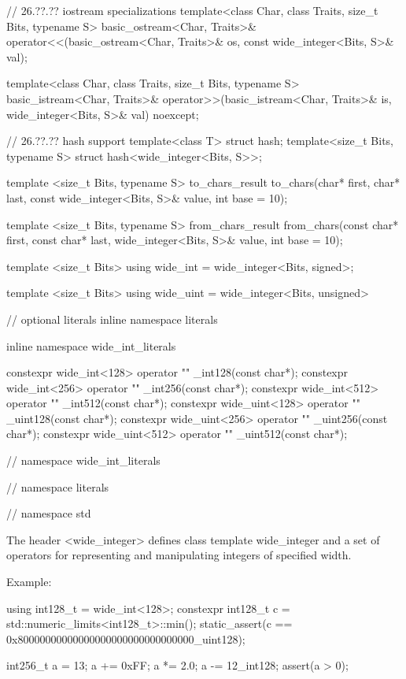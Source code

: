 \begin{codeblock}
{  // 26.??.?? iostream specializations
  template<class Char, class Traits, size_t Bits, typename S>
    basic_ostream<Char, Traits>& operator<<(basic_ostream<Char, Traits>& os,
                                            const wide_integer<Bits, S>& val);
  
  template<class Char, class Traits, size_t Bits, typename S>
    basic_istream<Char, Traits>& operator>>(basic_istream<Char, Traits>& is,
                                            wide_integer<Bits, S>& val) noexcept;
  
  // 26.??.?? hash support
  template<class T> struct hash;
  template<size_t Bits, typename S> struct hash<wide_integer<Bits, S>>;
  
  
  template <size_t Bits, typename S>
    to_chars_result to_chars(char* first, char* last, const wide_integer<Bits, S>& value,
                             int base = 10);
  
  template <size_t Bits, typename S>
    from_chars_result from_chars(const char* first, const char* last, wide_integer<Bits, S>& value,
                                 int base = 10);
  
  template <size_t Bits>
  using wide_int = wide_integer<Bits, signed>;
  
  template <size_t Bits>
  using wide_uint = wide_integer<Bits, unsigned>
  
  // optional literals
  inline namespace literals {
  inline namespace wide_int_literals {
        
  constexpr wide_int<128> operator "" _int128(const char*);
  constexpr wide_int<256> operator "" _int256(const char*);
  constexpr wide_int<512> operator "" _int512(const char*);
  constexpr wide_uint<128> operator "" _uint128(const char*);
  constexpr wide_uint<256> operator "" _uint256(const char*);
  constexpr wide_uint<512> operator "" _uint512(const char*);
        
  } // namespace wide_int_literals
  } // namespace literals

} // namespace std
\end{codeblock}

The header <wide_integer> defines class template wide_integer and a set of operators for representing and manipulating integers of specified width. 

Example:
\begin{codeblock}
using int128_t = wide_int<128>;
constexpr int128_t c = std::numeric_limits<int128_t>::min();
static_assert(c == 0x80000000000000000000000000000000_uint128);

int256_t a = 13;
a += 0xFF;
a *= 2.0;
a -= 12_int128;
assert(a > 0);    
\end{codeblock}


